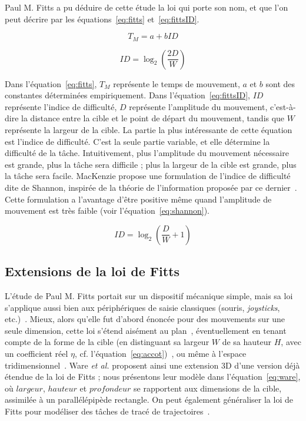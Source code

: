 	Paul M. Fitts a pu déduire de cette étude la loi qui porte son nom, et que l'on peut décrire par les équations~\ref{eq:fitts} et~\ref{eq:fittsID}.
	
	\begin{equation}
		\label{eq:fitts}
		T_{M} = a + bID
	\end{equation}
	
	\begin{equation}
		\label{eq:fittsID}
		ID = \log_2\left(\frac{2D}{W} \right)
	\end{equation}
	
	Dans l'équation~\ref{eq:fitts}, $T_{M}$ représente le temps de mouvement, $a$ et $b$ sont des constantes déterminées empiriquement. Dans l'équation~\ref{eq:fittsID}, $ID$ représente l'indice de difficulté, $D$ représente l'amplitude du mouvement, c'est-à-dire la distance entre la cible et le point de départ du mouvement, tandis que $W$ représente la largeur de la cible. La partie la plus intéressante de cette équation est l'indice de difficulté. C'est la seule partie variable, et elle détermine la difficulté de la tâche. Intuitivement, plus l'amplitude du mouvement nécessaire est grande, plus la tâche sera difficile ; plus la largeur de la cible est grande, plus la tâche sera facile. MacKenzie propose une formulation de l'indice de difficulté dite de Shannon, inspirée de la théorie de l'information proposée par ce dernier~\cite{mackenzie1989note}. Cette formulation a l'avantage d'être positive même quand l'amplitude de mouvement est très faible (voir l'équation~\ref{eq:shannon}).
	
	\begin{equation}
		\label{eq:shannon}
		ID = \log_2\left(\frac{D}{W} + 1\right)
	\end{equation}
	
	\subsection{Extensions de la loi de Fitts}
	L'étude de Paul M. Fitts portait sur un dispositif mécanique simple, mais sa loi s'applique aussi bien aux périphériques de saisie classiques (souris, \emph{joysticks}, etc.)~\cite{card1978evaluation}. Mieux, alors qu'elle fut d'abord énoncée pour des mouvements sur une seule dimension, cette loi s'étend aisément au plan~\cite{card1978evaluation, mackenzie1992extending}, éventuellement en tenant compte de la forme de la cible (en distinguant sa largeur $W$ de sa hauteur $H$, avec un coefficient réel $\eta$, cf. l'équation~\ref{eq:accot})~\cite{accot2003refining}, ou même à l'espace tridimensionnel~\cite{ware1997selection, murata2001extending}. Ware \emph{et al.} proposent ainsi une extension 3D d'une version déjà étendue de la loi de Fitts ; nous présentons leur modèle dans l'équation~\ref{eq:ware}, où $largeur$, $hauteur$ et $profondeur$ se rapportent aux dimensions de la cible, assimilée à un parallélépipède rectangle. On peut également généraliser la loi de Fitts pour modéliser des tâches de tracé de trajectoires~\cite{accot1997beyond, accot1999performance}.
	
